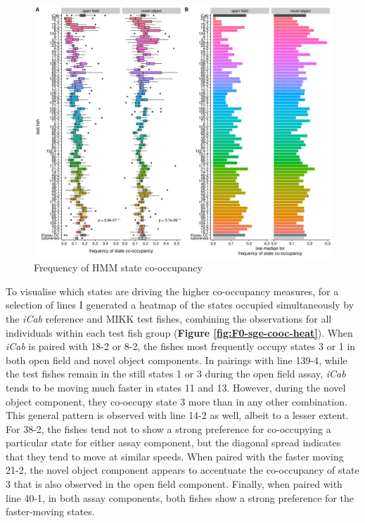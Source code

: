 \documentclass[
]{article}
\begin{document}
\begin{figure}
\includegraphics[width=1\linewidth]{figs/mikk_behaviour/0.08_15_cooc_box_all} \caption{Frequency of HMM state co-occupancy}\label{fig:F0-sge-cooc-box}
\end{figure}

To visualise which states are driving the higher co-occupancy measures, for a selection of lines I generated a heatmap of the states occupied simultaneously by the \emph{\textcolor{iCab_424B4D}{iCab}} reference and MIKK test fishes, combining the observations for all individuals within each test fish group (\textbf{Figure \ref{fig:F0-sge-cooc-heat}}). When \emph{\textcolor{iCab_424B4D}{iCab}} is paired with \textcolor{18-2_FF66A6}{18-2} or \textcolor{8-2_FF699C}{8-2}, the fishes most frequently occupy states 3 or 1 in both open field and novel object components. In pairings with line \textcolor{139-4_FF61CC}{139-4}, while the test fishes remain in the still states 1 or 3 during the open field assay, \emph{\textcolor{iCab_424B4D}{iCab}} tends to be moving much faster in states 11 and 13. However, during the novel object component, they co-occupy state 3 more than in any other combination. This general pattern is observed with line \textcolor{14-2_F066EA}{14-2} as well, albeit to a lesser extent. For \textcolor{38-2_00C08B}{38-2}, the fishes tend not to show a strong preference for co-occupying a particular state for either assay component, but the diagonal spread indicates that they tend to move at similar speeds. When paired with the faster moving \textcolor{21-2_49B500}{21-2}, the novel object component appears to accentuate the co-occupancy of state 3 that is also observed in the open field component. Finally, when paired with line \textcolor{40-1_93AA00}{40-1}, in both assay components, both fishes show a strong preference for the faster-moving states.
\end{document}
